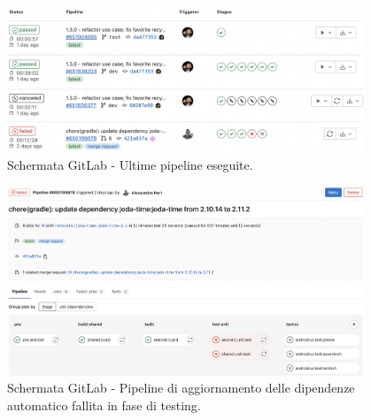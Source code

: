 \begin{figure}[H]
\centering
    \includegraphics[width=0.95\textwidth]{img/Screenshot 2022-09-28 at 15.58.43.png}
    \caption{Schermata GitLab - Ultime pipeline eseguite.}
    \label{pipelinesapp}
\end{figure}

\begin{figure}[H]
\centering
    \includegraphics[width=0.95\textwidth]{img/Screenshot 2022-09-28 at 15.54.26.png}
    \caption{Schermata GitLab - Pipeline di aggiornamento delle dipendenze automatico fallita in fase di testing.}
    \label{mergerequestrenova}
\end{figure}

\newpage
